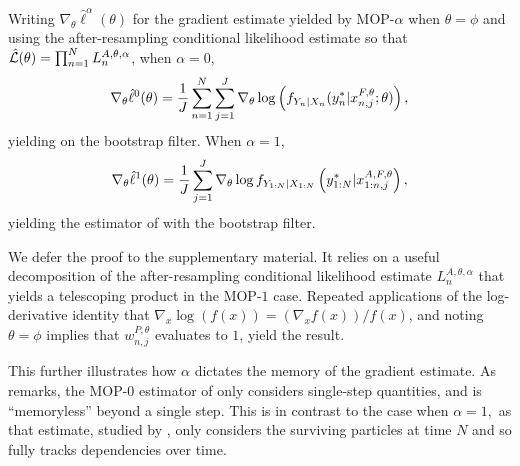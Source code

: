 \documentclass[11pt]{article}
\begin{document}
\begin{thm}
    \label{thm:mop-functional-forms}
    Writing $\nabla_\theta \hat\ell^\alpha(\theta)$ for the gradient estimate yielded by MOP-$\alpha$ when $\theta=\phi$ and using the after-resampling conditional likelihood estimate so that $\hat{\mathcal{L}}(\theta) = \prod_{n=1}^N L_n^{A, \theta, \alpha}$, when $\alpha=0$,
    \vspace*{-2.5mm}
    \begin{equation}
        \nabla_\theta \hat\ell^0(\theta) 
        = \frac{1}{J} \sum_{n=1}^N \sum_{j=1}^J \nabla_\theta \log\left(f_{Y_n|X_{n}}(y_n^*|x_{n,j}^{F, \theta}; \theta)\right),
        \vspace*{-2.5mm}
    \end{equation}
    yielding \cite{naesseth18} on the bootstrap filter. When $\alpha=1$,
    \vspace*{-2.5mm}
    \begin{equation}
        \nabla_\theta \hat{\ell}^1(\theta) 
        = \frac{1}{J}\sum_{j=1}^J \nabla_\theta \log f_{Y_{1:N}|X_{1:N}}\left(y_{1:N}^* | x_{1:n,j}^{A, F,\theta}\right),
    \vspace*{-2.5mm}
    \end{equation}
    yielding the estimator of \cite{poyiadjis11, scibior21} with the bootstrap filter.
\end{thm}

We defer the proof to the supplementary material. It relies on a useful decomposition of the after-resampling conditional likelihood estimate $L_n^{A,\theta,\alpha}$ that yields a telescoping product in the MOP-$1$ case. Repeated applications of the log-derivative identity that $\nabla_x \log(f(x)) = (\nabla_x f(x))/f(x)$, and noting $\theta=\phi$ implies that $w_{n,j}^{P,\theta}$ evaluates to $1$, yield the result. 

This further illustrates how $\alpha$ dictates the memory of the gradient estimate. As \cite{scibior21} remarks, the MOP-$0$ estimator of \cite{naesseth18} only considers single-step quantities, and is ``memoryless'' beyond a single step. This is in contrast to the case when $\alpha=1,$ as that estimate, studied by \cite{poyiadjis11}, only considers the surviving particles at time $N$ and so fully tracks dependencies over time. 
\end{document}
